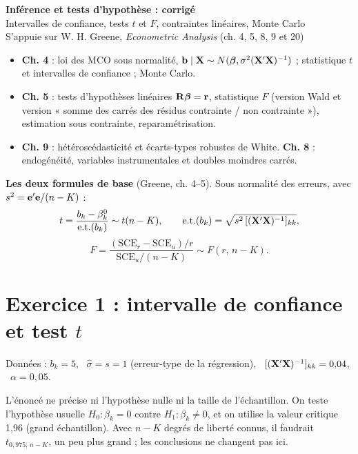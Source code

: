 \documentclass[11pt,a4paper]{article}
\newcommand{\vbeta}{\bm{\beta}}\newcommand{\vgamma}{\bm{\gamma}}\newcommand{\veps}{\bm{\epsilon}}
\begin{document}
\begin{center}
{\LARGE\bfseries Inférence et tests d'hypothèse : corrigé}\\[6pt]
{\large Intervalles de confiance, tests $t$ et $F$, contraintes linéaires, Monte Carlo}\\[4pt]
{\small S'appuie sur W. H. Greene, \emph{Econometric Analysis} (ch. 4, 5, 8, 9 et 20)}
\end{center}

\begin{greene}
\begin{itemize}[nosep]
\item \textbf{Ch. 4} : loi des MCO sous normalité, $\vb\mid\vX\sim N(\vbeta,\sigma^2(\vX'\vX)^{-1})$ ; statistique $t$ et intervalles de confiance ; Monte Carlo.
\item \textbf{Ch. 5} : tests d'hypothèses linéaires $\R\vbeta=\vr$, statistique $F$ (version Wald et version « somme des carrés des résidus contrainte / non contrainte »), estimation sous contrainte, reparamétrisation.
\item \textbf{Ch. 9} : hétéroscédasticité et écarts-types robustes de White. \textbf{Ch. 8} : endogénéité, variables instrumentales et doubles moindres carrés.
\end{itemize}
\end{greene}

\textbf{Les deux formules de base} (Greene, ch. 4--5). Sous normalité des erreurs, avec $s^2=\mathbf{e}'\mathbf{e}/(n-K)$ :
\[
t=\frac{b_k-\beta_k^0}{\text{e.t.}(b_k)}\sim t(n-K),\qquad \text{e.t.}(b_k)=\sqrt{s^2\,[(\mathbf{X}'\mathbf{X})^{-1}]_{kk}},
\]
\[
F=\frac{(\text{SCE}_r-\text{SCE}_u)/r}{\text{SCE}_u/(n-K)}\sim F(r,\,n-K).
\]

\tableofcontents

\section{Exercice 1 : intervalle de confiance et test $t$}

Données : $b_k=5$, \ $\hat\sigma=s=1$ (erreur-type de la régression), \ $[(\mathbf{X}'\mathbf{X})^{-1}]_{kk}=0{,}04$, \ $\alpha=0{,}05$.

\begin{attention}
L'énoncé ne précise ni l'hypothèse nulle ni la taille de l'échantillon. On teste l'hypothèse usuelle $H_0:\beta_k=0$ contre $H_1:\beta_k\neq0$, et on utilise la valeur critique 1,96 (grand échantillon). Avec $n-K$ degrés de liberté connus, il faudrait $t_{0{,}975;\,n-K}$, un peu plus grand ; les conclusions ne changent pas ici.
\end{attention}
\end{document}

